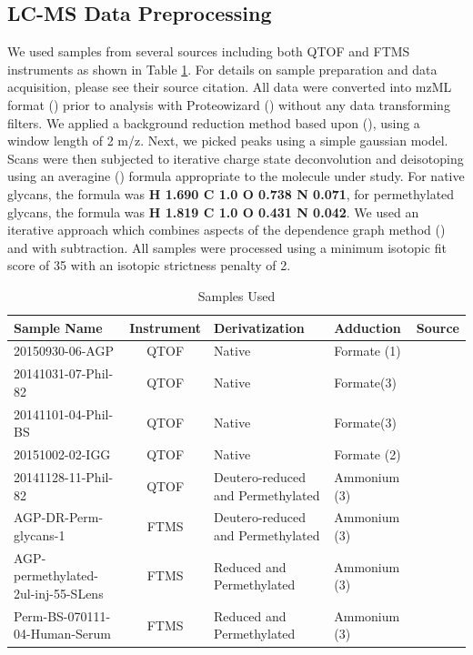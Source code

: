 \subsection{LC-MS Data Preprocessing}
    We used samples from several sources including both QTOF and FTMS instruments as shown
    in Table \ref{tbl:sample_overview}. For details on sample preparation and data acquisition,
    please see their source citation. All data were converted into mzML format (\cite{Martens2011})
    prior to analysis with Proteowizard (\cite{Kessner2008}) without any data transforming filters.
    We applied a background reduction method based upon (\cite{Kaur2006}), using a window length
    of 2 m/z. Next, we picked peaks using a simple gaussian model. Scans were then subjected
    to iterative charge state deconvolution and deisotoping using an averagine (\cite{Senko1995})
    formula appropriate to the molecule under study. For native glycans, the formula was
    \textbf{H 1.690 C 1.0 O 0.738 N 0.071}, for permethylated glycans, the formula was
    \textbf{H 1.819 C 1.0 O 0.431 N 0.042}. We used an iterative approach which combines
    aspects of the dependence graph method (\cite{Liu2010}) and with subtraction. All samples
    were processed using a minimum isotopic fit score of 35 with an isotopic strictness penalty
    of 2.

    \renewcommand{\arraystretch}{1.5}
    \begin{table}
        \caption{Samples Used}\label{tbl:sample_overview}
        \centering
        \begin{tabular}{p{4cm} | c | p{3cm} | p{3cm} | c}
            Sample Name & Instrument & Derivatization & Adduction & Source\\
            \hline
            20150930-06-AGP & QTOF & Native & Formate (1) & \cite{Khatri2016a}\\
            20141031-07-Phil-82 & QTOF & Native & Formate(3) & \cite{Khatri2016a}\\
            20141101-04-Phil-BS & QTOF & Native & Formate(3) & \cite{Khatri2016a}\\
            20151002-02-IGG & QTOF & Native & Formate (2) & \cite{Khatri2016b}\\
            20141128-11-Phil-82 & QTOF & Deutero-reduced and Permethylated & Ammonium (3) & \cite{Khatri2016a}\\
            AGP-DR-Perm-glycans-1 & FTMS & Deutero-reduced and Permethylated & Ammonium (3) & \cite{Khatri2016a}\\
            AGP-permethylated-2ul-inj-55-SLens & FTMS & Reduced and Permethylated & Ammonium (3)
                                                      & \cite{Khatri2016a}\\
            Perm-BS-070111-04-Human-Serum & FTMS & Reduced and Permethylated & Ammonium (3) & \cite{Yu2013}\\
        \end{tabular}
    \end{table}
    \renewcommand{\arraystretch}{1.0}

